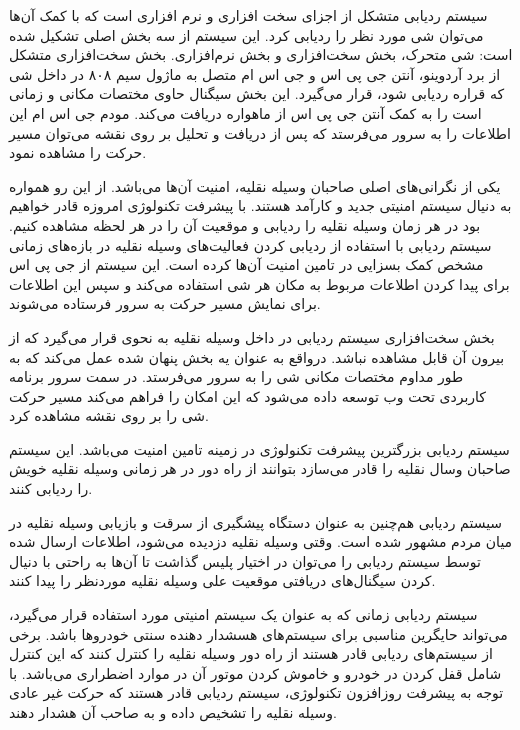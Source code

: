 سیستم ردیابی متشکل از اجزای سخت‌ افزاری و نرم ‌افزاری است که با کمک آن‌ها می‌توان شی مورد نظر را ردیابی کرد. این سیستم از سه بخش اصلی تشکیل شده است: شی متحرک، بخش سخت‌افزاری و بخش نرم‌افزاری.
بخش سخت‌افزاری متشکل از برد آردوینو، آنتن جی پی اس و جی اس ام متصل به ماژول سیم ۸۰۸  در داخل شی که قراره ردیابی شود، قرار می‌گیرد. این بخش سیگنال حاوی مختصات مکانی و زمانی است را به کمک آنتن جی پی اس از ماهواره دریافت می‌کند. مودم جی اس ام این اطلاعات را به سرور می‌فرستد که پس از دریافت و تحلیل بر روی نقشه می‌توان مسیر حرکت را مشاهده نمود.


 یکی از نگرانی‌های اصلی صاحبان وسیله نقلیه، امنیت آن‌ها می‌باشد. از این رو همواره به دنیال سیستم امنیتی جدید و کارآمد هستند. با پیشرفت تکنولوژی امروزه قادر خواهیم بود در هر زمان وسیله نقلیه را ردیابی و موقعیت آن را در هر لحظه مشاهده کنیم. سیستم ردیابی با استفاده از ردیابی  کردن فعالیت‌های وسیله نقلیه در بازه‌های زمانی مشخص کمک بسزایی در تامین امنیت آن‌ها کرده است. این سیستم از جی پی اس برای پیدا کردن اطلاعات مربوط به مکان هر شی استفاده می‌کند و سپس  این اطلاعات برای نمایش مسیر حرکت به سرور فرستاده می‌شوند.
 
 
 بخش سخت‌افزاری سیستم ردیابی در داخل وسیله نقلیه به نحوی قرار می‌گیرد که از بیرون آن قابل مشاهده نباشد. درواقع به عنوان یه بخش پنهان شده عمل می‌کند که به طور مداوم مختصات مکانی شی را به سرور می‌فرستد.
 در سمت سرور برنامه کاربردی تحت وب توسعه داده می‌شود که این امکان را فراهم می‌کند  مسیر حرکت شی را بر روی نقشه مشاهده کرد.
 
 سیستم ردیابی بزرگترین پیشرفت تکنولوژی در زمینه تامین امنیت می‌باشد. این سیستم صاحبان وسال نقلیه را قادر می‌سازد بتوانند از راه دور در هر زمانی وسیله نقلیه خویش را ردیابی کنند.
 
 
 سیستم ردیابی هم‌چنین به عنوان دستگاه پیشگیری از سرقت و بازیابی وسیله نقلیه در میان مردم مشهور شده است. وقتی وسیله نقلیه دزدیده می‌شود، اطلاعات ارسال شده توسط سیستم ردیابی را می‌توان در اختیار پلیس گذاشت تا آن‌ها به راحتی با دنیال کردن سیگنال‌های دریافتی موقعیت علی وسیله نقلیه موردنظر را پیدا کنند.
 
 
 سیستم ردیابی زمانی که به عنوان یک سیستم امنیتی مورد استفاده قرار می‌گیرد، می‌تواند حایگرین مناسبی برای سیستم‌های هسشدار دهنده سنتی خودروها باشد. برخی از سیستم‌های ردیابی قادر هستند از راه دور وسیله نقلیه را کنترل کنند که این کنترل شامل قفل کردن در خودرو و خاموش کردن موتور آن در موارد اضطراری می‌باشد. با توجه به پیشرفت روزافزون تکنولوژی، سیستم ردیابی قادر هستند که حرکت غیر عادی وسیله نقلیه را تشخیص داده و به صاحب آن هشدار دهند.
 
